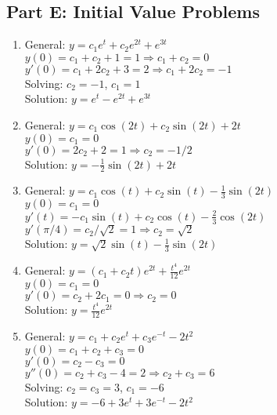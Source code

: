 \documentclass[12pt]{article}
\begin{document}
\subsection*{Part E: Initial Value Problems}

\begin{enumerate}[resume]
\item General: $y = c_1e^t + c_2e^{2t} + e^{3t}$\\
$y(0) = c_1 + c_2 + 1 = 1 \Rightarrow c_1 + c_2 = 0$\\
$y'(0) = c_1 + 2c_2 + 3 = 2 \Rightarrow c_1 + 2c_2 = -1$\\
Solving: $c_2 = -1$, $c_1 = 1$\\
Solution: $y = e^t - e^{2t} + e^{3t}$

\item General: $y = c_1\cos(2t) + c_2\sin(2t) + 2t$\\
$y(0) = c_1 = 0$\\
$y'(0) = 2c_2 + 2 = 1 \Rightarrow c_2 = -1/2$\\
Solution: $y = -\frac{1}{2}\sin(2t) + 2t$

\item General: $y = c_1\cos(t) + c_2\sin(t) - \frac{1}{3}\sin(2t)$\\
$y(0) = c_1 = 0$\\
$y'(t) = -c_1\sin(t) + c_2\cos(t) - \frac{2}{3}\cos(2t)$\\
$y'(\pi/4) = c_2/\sqrt{2} = 1 \Rightarrow c_2 = \sqrt{2}$\\
Solution: $y = \sqrt{2}\sin(t) - \frac{1}{3}\sin(2t)$

\item General: $y = (c_1 + c_2t)e^{2t} + \frac{t^4}{12}e^{2t}$\\
$y(0) = c_1 = 0$\\
$y'(0) = c_2 + 2c_1 = 0 \Rightarrow c_2 = 0$\\
Solution: $y = \frac{t^4}{12}e^{2t}$

\item General: $y = c_1 + c_2e^t + c_3e^{-t} - 2t^2$\\
$y(0) = c_1 + c_2 + c_3 = 0$\\
$y'(0) = c_2 - c_3 = 0$\\
$y''(0) = c_2 + c_3 - 4 = 2 \Rightarrow c_2 + c_3 = 6$\\
Solving: $c_2 = c_3 = 3$, $c_1 = -6$\\
Solution: $y = -6 + 3e^t + 3e^{-t} - 2t^2$
\end{enumerate}
\end{document}

